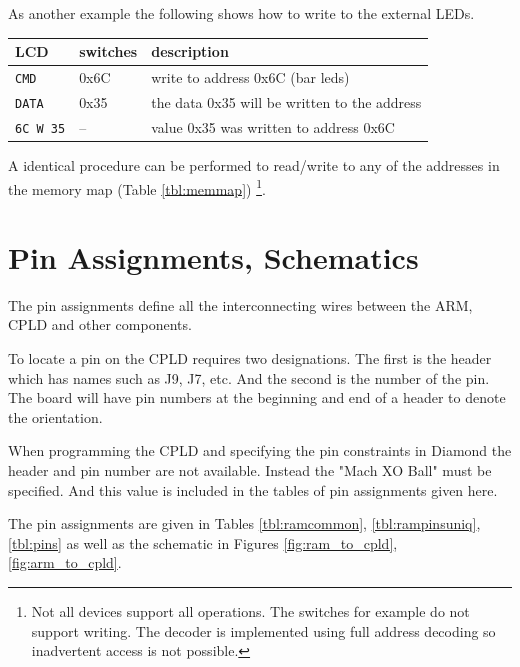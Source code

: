 \documentclass{article}
\begin{document}
As another example the following shows how to write to the external LEDs.

\begin{tabular}{l l l}
LCD & switches & description \\
\hline
\verb+CMD+  & 0x6C & write to address 0x6C (bar leds) \\
\verb+DATA+ & 0x35 & the data 0x35 will be written to the address \\
\verb+6C W 35+ & -- & value 0x35 was written to address 0x6C
\end{tabular}

A identical procedure can be performed to read/write to any
of the addresses in the memory map (Table \ref{tbl:memmap})
\footnote{Not all devices support all operations.  The switches for example
do not support writing.  The decoder is implemented using full
address decoding so inadvertent access is not possible.}.


\section{Pin Assignments, Schematics}
\label{sec:pa}

The pin assignments define all the interconnecting wires
between the ARM, CPLD and other components.

To locate a pin on the CPLD requires two designations\citep[Pg. 11-14]{EB66}.
The first is the header which has names such as J9, J7, etc.
And the second is the number of the pin.
The board will have pin numbers at the beginning and end of a header
to denote the orientation.

When programming the CPLD and specifying the pin constraints
in Diamond\cite{Diamond} the header and pin number are not available.
Instead the "Mach XO Ball" must be specified.
And this value is included in the tables of pin assignments given here.

The pin assignments are given in Tables
\ref{tbl:ramcommon}, \ref{tbl:rampinsuniq}, \ref{tbl:pins}
as well as the schematic in Figures \ref{fig:ram_to_cpld}, \ref{fig:arm_to_cpld}.
\end{document}
